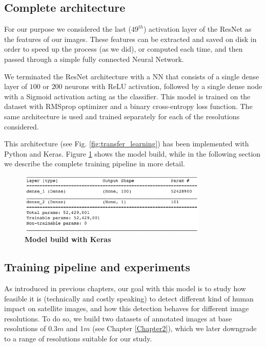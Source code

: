 \subsection{Complete architecture}

For our purpose we considered the last ($49^{th}$) activation layer of the ResNet as the features of our images. These features can be extracted and saved on disk in order to speed up the process (as we did), or computed each time, and then passed through a simple fully connected Neural Network.

We terminated the ResNet architecture with a NN that consists of a single dense layer of $100$ or $200$ neurons with ReLU activation, followed by a single dense node with a Sigmoid activation acting as the classifier. This model is trained on the dataset with RMSprop optimizer \parencite{ruder2016} and a binary cross-entropy loss function. The same architecture is used and trained separately for each of the resolutions considered. 

This architecture (see Fig. \ref{fig:transfer_learning}) has been implemented with Python and Keras. Figure \ref{fig:model_keras} shows the model build, while in the following section we describe the complete training pipeline in more detail.

\begin{figure}[h!]
	\centering
	\includegraphics[width=0.8\textwidth]{Figures/model_keras.png}
	\captionsetup{width=1\linewidth}
	\caption{\textbf{Model build with Keras}}
	\label{fig:model_keras}
\end{figure}


\subsection{Training pipeline and experiments}

As introduced in previous chapters, our goal with this model is to study how feasible it is (technically and costly speaking) to detect different kind of human impact on satellite images, and how this detection behaves for different image resolutions. To do so, we build two datasets of annotated images at base resolutions of $0.3m$ and $1m$ (see Chapter \ref{Chapter2}), which we later downgrade to a range of resolutions suitable for our study.

